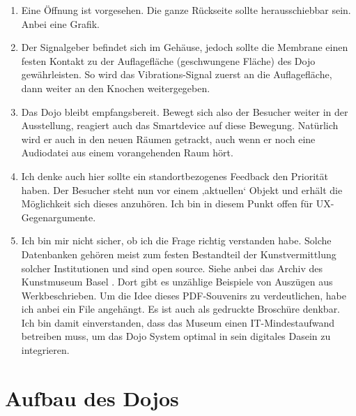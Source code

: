 \begin{enumerate}
\item Eine Öffnung ist vorgesehen. Die ganze Rückseite sollte herausschiebbar sein. Anbei eine Grafik.

\item Der Signalgeber befindet sich im Gehäuse, jedoch sollte die Membrane einen festen Kontakt zu der Auflagefläche (geschwungene Fläche) des Dojo gewährleisten. So wird das Vibrations-Signal zuerst an die Auflagefläche, dann weiter an den Knochen weitergegeben.

\item Das Dojo bleibt empfangsbereit. Bewegt sich also der Besucher weiter in der Ausstellung, reagiert auch das Smartdevice auf diese Bewegung. Natürlich wird er auch in den neuen Räumen getrackt, auch wenn er noch eine Audiodatei aus einem vorangehenden Raum hört.

\item Ich denke auch hier sollte ein standortbezogenes Feedback den Priorität haben. Der Besucher steht nun vor einem ‚aktuellen‘ Objekt und erhält die Möglichkeit sich dieses anzuhören.
Ich bin in diesem Punkt offen für UX-Gegenargumente.

\item Ich bin mir nicht sicher, ob ich die Frage richtig verstanden habe. Solche Datenbanken gehören meist zum festen Bestandteil der Kunstvermittlung solcher Institutionen und sind open source. Siehe anbei das Archiv des Kunstmuseum Basel . Dort gibt es unzählige Beispiele von Auszügen aus Werkbeschrieben. Um die Idee dieses PDF-Souvenirs zu verdeutlichen, habe ich anbei ein File angehängt. Es ist auch als gedruckte Broschüre denkbar. 
Ich bin damit einverstanden, dass das Museum einen IT-Mindestaufwand betreiben muss, um das Dojo System optimal in sein digitales Dasein zu integrieren.



\end{enumerate}

\newpage
  
  
  

\newpage

\section{Aufbau des Dojos}

